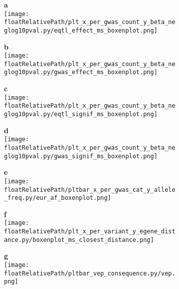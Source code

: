 \begin{figure}[!ht]

    \begin{subfigure}[]{.49\textwidth}
        \textbf{a}
        \\
        \texttt{[image: \\floatRelativePath/plt\_x\_per\_gwas\_count\_y\_beta\_neglog10pval.py/eqtl\_effect\_ms\_boxenplot.png]}
    \end{subfigure}
    \begin{subfigure}[]{.49\textwidth}
        \textbf{b}
        \\
        \texttt{[image: \\floatRelativePath/plt\_x\_per\_gwas\_count\_y\_beta\_neglog10pval.py/gwas\_effect\_ms\_boxenplot.png]}
    \end{subfigure}

    \begin{subfigure}[]{.49\textwidth}
        \textbf{c}
        \\
        \texttt{[image: \\floatRelativePath/plt\_x\_per\_gwas\_count\_y\_beta\_neglog10pval.py/eqtl\_signif\_ms\_boxenplot.png]}
    \end{subfigure}
    \begin{subfigure}[]{.49\textwidth}
        \textbf{d}
        \\
        \texttt{[image: \\floatRelativePath/plt\_x\_per\_gwas\_count\_y\_beta\_neglog10pval.py/gwas\_signif\_ms\_boxenplot.png]}
    \end{subfigure}

    \centering
    \begin{subfigure}[]{.49\textwidth}
        \textbf{e}
        \\
        \texttt{[image: \\floatRelativePath/pltbar\_x\_per\_gwas\_cat\_y\_allele\_freq.py/eur\_af\_boxenplot.png]}
    \end{subfigure}
    \begin{subfigure}[]{.49\textwidth}
        \textbf{f}
        \\
        \texttt{[image: \\floatRelativePath/plt\_x\_per\_variant\_y\_egene\_distance.py/boxenplot\_ms\_closest\_distance.png]}
    \end{subfigure}

    \begin{subfigure}[]{.49\textwidth}
        \textbf{g}
        \\
        \texttt{[image: \\floatRelativePath/pltbar\_vep\_consequence.py/vep.png]}
    \end{subfigure}

    \caption{}

\end{figure}

